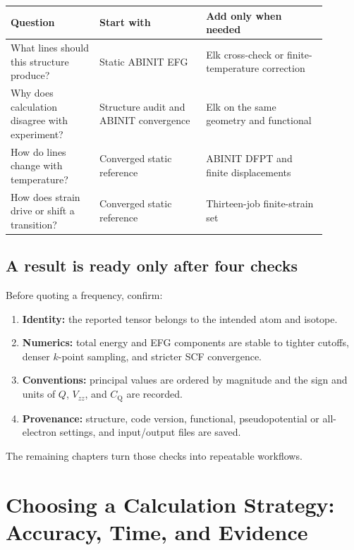 \documentclass[11pt,oneside]{report}
\newcommand{\Cq}{C_{\mathrm{Q}}}
\newcommand{\Vzz}{V_{zz}}
\begin{document}
\begin{center}
\begin{tabular}{>{\raggedright\arraybackslash}p{0.25\linewidth}
                >{\raggedright\arraybackslash}p{0.30\linewidth}
                >{\raggedright\arraybackslash}p{0.34\linewidth}}
\toprule
Question & Start with & Add only when needed \\
\midrule
What lines should this structure produce? & Static ABINIT EFG & Elk cross-check
or finite-temperature correction \\
Why does calculation disagree with experiment? & Structure audit and ABINIT
convergence & Elk on the same geometry and functional \\
How do lines change with temperature? & Converged static reference & ABINIT
DFPT and finite displacements \\
How does strain drive or shift a transition? & Converged static reference &
Thirteen-job finite-strain set \\
\bottomrule
\end{tabular}
\end{center}

\section{A result is ready only after four checks}

Before quoting a frequency, confirm:
\begin{enumerate}
  \item \textbf{Identity:} the reported tensor belongs to the intended atom and
  isotope.
  \item \textbf{Numerics:} total energy and EFG components are stable to tighter
  cutoffs, denser $k$-point sampling, and stricter SCF convergence.
  \item \textbf{Conventions:} principal values are ordered by magnitude and the
  sign and units of $Q$, $\Vzz$, and $\Cq$ are recorded.
  \item \textbf{Provenance:} structure, code version, functional,
  pseudopotential or all-electron settings, and input/output files are saved.
\end{enumerate}
The remaining chapters turn those checks into repeatable workflows.

\chapter{Choosing a Calculation Strategy: Accuracy, Time, and Evidence}
\label{ch:strategy}
\end{document}
